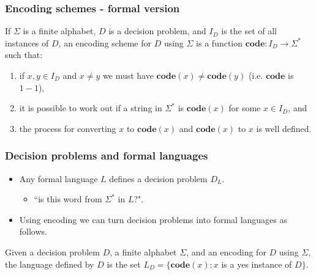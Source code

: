 \documentclass[handout]{beamer}
\begin{document}
\begin{frame}
\frametitle{Encoding schemes - formal version}
\begin{definition}
If $\Sigma$ is a finite alphabet, $D$ is a decision problem, and $I_D$ is the set of all instances of $D$, an encoding scheme for $D$ using $\Sigma$ is a function $\mathbf{code}: I_D\to \Sigma^*$ such that:
\vspace{0.2cm}
\begin{enumerate}
\item if $x,y\in I_D$ and $x\neq y$ we must have $\mathbf{code}(x)\neq \mathbf{code}(y)$ (i.e. $\mathbf{code}$ is $1-1$),
\vspace{0.2cm}
\item it is possible to work out if a string in $\Sigma^*$ is $\mathbf{code}(x)$ for some $x\in I_D$, and
\vspace{0.2cm} 
\item the process for converting $x$ to $\mathbf{code}(x)$ and $\mathbf{code}(x)$ to $x$ is well defined. 
\end{enumerate}
\end{definition}
\end{frame}

\begin{frame}
\frametitle{Decision problems and formal languages}
\begin{itemize} 
\item Any formal language $L$ defines a decision problem $D_L$.
\vspace{0.2cm}
\begin{itemize}
\item ``is this word from $\Sigma^*$ in $L$?". 
\end{itemize}
\vspace{0.2cm}
\item Using encoding we can turn decision problems into formal languages as follows.
\end{itemize}

\begin{definition}[$L_D$]\label{D:LD}
Given a decision problem $D$, a finite alphabet $\Sigma$, and an encoding for $D$ using $\Sigma$, the language defined by $D$ is the set $L_D=\{\textbf{code}(x):x$ is a yes instance of $D\}$.
\end{definition}

\end{frame}
\end{document}
